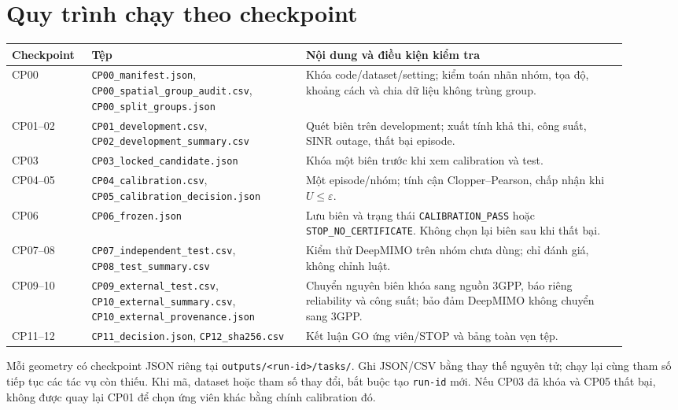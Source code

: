 \documentclass[onecolumn,11pt]{IEEEtran}
\begin{document}
\section{Quy trình chạy theo checkpoint}
\begin{longtable}{p{0.11\linewidth}p{0.32\linewidth}p{0.48\linewidth}}
\toprule Checkpoint & Tệp & Nội dung và điều kiện kiểm tra\\\midrule
CP00 & \texttt{CP00\_manifest.json}, \texttt{CP00\_spatial\_group\_audit.csv}, \texttt{CP00\_split\_groups.json} & Khóa code/dataset/setting; kiểm toán nhãn nhóm, tọa độ, khoảng cách và chia dữ liệu không trùng group.\\
CP01--02 & \texttt{CP01\_development.csv}, \texttt{CP02\_development\_summary.csv} & Quét biên trên development; xuất tính khả thi, công suất, SINR outage, thất bại episode.\\
CP03 & \texttt{CP03\_locked\_candidate.json} & Khóa một biên trước khi xem calibration và test.\\
CP04--05 & \texttt{CP04\_calibration.csv}, \texttt{CP05\_calibration\_decision.json} & Một episode/nhóm; tính cận Clopper--Pearson, chấp nhận khi $U\le\varepsilon$.\\
CP06 & \texttt{CP06\_frozen.json} & Lưu biên và trạng thái \texttt{CALIBRATION\_PASS} hoặc \texttt{STOP\_NO\_CERTIFICATE}. Không chọn lại biên sau khi thất bại.\\
CP07--08 & \texttt{CP07\_independent\_test.csv}, \texttt{CP08\_test\_summary.csv} & Kiểm thử DeepMIMO trên nhóm chưa dùng; chỉ đánh giá, không chỉnh luật.\\
CP09--10 & \texttt{CP09\_external\_test.csv}, \texttt{CP10\_external\_summary.csv}, \texttt{CP10\_external\_provenance.json} & Chuyển nguyên biên khóa sang nguồn 3GPP, báo riêng reliability và công suất; bảo đảm DeepMIMO không chuyển sang 3GPP.\\
CP11--12 & \texttt{CP11\_decision.json}, \texttt{CP12\_sha256.csv} & Kết luận GO ứng viên/STOP và bảng toàn vẹn tệp.\\\bottomrule
\end{longtable}
Mỗi geometry có checkpoint JSON riêng tại \texttt{outputs/<run-id>/tasks/}. Ghi JSON/CSV bằng thay thế nguyên tử; chạy lại cùng tham số tiếp tục các tác vụ còn thiếu. Khi mã, dataset hoặc tham số thay đổi, bắt buộc tạo \texttt{run-id} mới. Nếu CP03 đã khóa và CP05 thất bại, không được quay lại CP01 để chọn ứng viên khác bằng chính calibration đó.
\end{document}
